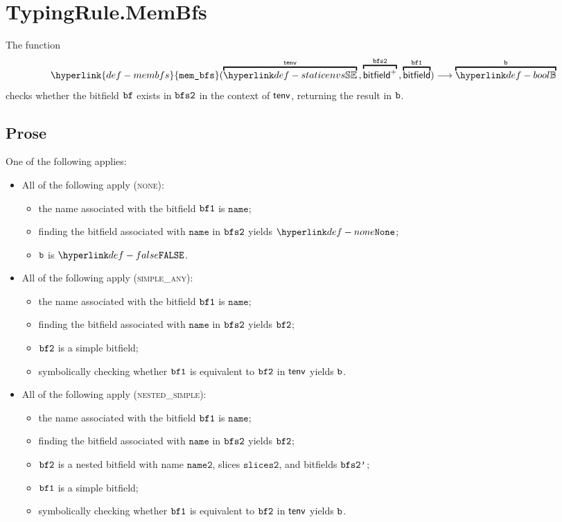 \documentclass{book}
\newcommand\membfs[0]{\hyperlink{def-membfs}{\texttt{mem\_bfs}}}
\newcommand\nametwo[0]{\texttt{name2}}
\newcommand\slicestwo[0]{\texttt{slices2}}
\newcommand\name[0]{\texttt{name}}
\begin{document}
\section{TypingRule.MemBfs}
\hypertarget{def-membfs}{}
The function
\[
  \membfs(\overname{\staticenvs}{\tenv} \aslsep \overname{\bitfield^+}{\bfstwo} \aslsep \overname{\bitfield}{\vbfone})
  \aslto \overname{\Bool}{\vb}
\]
checks whether the bitfield $\texttt{bf}$ exists in $\texttt{bfs2}$ in the context of $\textsf{tenv}$, returning the result in $\texttt{b}$.

\subsection{Prose}
One of the following applies:
\begin{itemize}
  \item All of the following apply (\textsc{none}):
  \begin{itemize}
    \item the name associated with the bitfield $\texttt{bf1}$ is $\name$;
    \item finding the bitfield associated with $\name$ in $\texttt{bfs2}$ yields $\None$;
    \item $\texttt{b}$ is $\False$.
  \end{itemize}

  \item All of the following apply (\textsc{simple\_any}):
  \begin{itemize}
    \item the name associated with the bitfield $\texttt{bf1}$ is $\name$;
    \item finding the bitfield associated with $\name$ in $\texttt{bfs2}$ yields $\texttt{bf2}$;
    \item $\texttt{bf2}$ is a simple bitfield;
    \item symbolically checking whether $\texttt{bf1}$ is equivalent to $\texttt{bf2}$ in $\textsf{tenv}$ yields $\texttt{b}$.
  \end{itemize}

  \item All of the following apply (\textsc{nested\_simple}):
  \begin{itemize}
    \item the name associated with the bitfield $\texttt{bf1}$ is $\name$;
    \item finding the bitfield associated with $\name$ in $\texttt{bfs2}$ yields $\texttt{bf2}$;
    \item $\texttt{bf2}$ is a nested bitfield with name $\nametwo$, slices $\slicestwo$, and bitfields $\texttt{bfs2'}$;
    \item $\texttt{bf1}$ is a simple bitfield;
    \item symbolically checking whether $\texttt{bf1}$ is equivalent to $\texttt{bf2}$ in $\textsf{tenv}$ yields $\texttt{b}$.
  \end{itemize}


\end{itemize}
\end{document}
